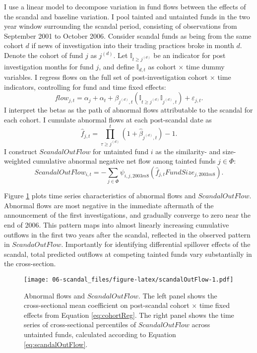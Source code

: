 \documentclass[openany]{book}
\theoremstyle{definition}
\theoremstyle{definition}
\theoremstyle{definition}
\theoremstyle{remark}
\begin{document}
I use a linear model to decompose variation in fund flows between the
effects of the scandal and baseline variation. I pool tainted and
untainted funds in the two year window surrounding the scandal period,
consisting of observations from September 2001 to October 2006. Consider
scandal funds as being from the same cohort \(d\) if news of
investigation into their trading practices broke in month \(d\). Denote
the cohort of fund \(j\) as \(j^{(d)}\). Let
\(\mathbb{I}_{t\geq j^{(d)}}\) be an indicator for post investigation
months for fund \(j\), and define \(\mathbb{I}_{d,t}\) as cohort
\(\times\) time dummy variables. I regress flows on the full set of
post-investigation cohort \(\times\) time indicators, controlling for
fund and time fixed effects: \begin{equation}
flow_{j,t}=\alpha_j+\alpha_t +\beta_{j^{(d)},t} \left( \mathbb{I}_{t\geq j^{(d)}}\mathbb{I}_{j^{(d)},t} \right) + \varepsilon_{j,t}.
\label{eq:cohortReg}
\end{equation} I interpret the betas as the path of abnormal flows
attributable to the scandal for each cohort. I cumulate abnormal flows
at each post-scandal date as \begin{equation}
\hat{f}_{j,t} = \prod_{\tau\geq j^{(d)}}^t \left(1+\hat{\beta}_{j^{(d)},t}\right) - 1.
\end{equation} I construct \(ScandalOutFlow\) for untainted fund \(i\)
as the similarity- and size-weighted cumulative abnormal negative net
flow among tainted funds \(j\in\Phi\): \begin{equation}
ScandalOutFlow_{i,t}= -\sum_{j\in \Phi} \psi_{i,j,2003m8} \left(\hat{f}_{j,t} FundSize_{j,2003m8} \right).
\label{eq:scandalOutFlow}
\end{equation}

Figure \ref{fig:scandalOutFlow} plots time series characteristics of
abnormal flows and \(ScandalOutFlow\). Abnormal flows are most negative
in the immediate aftermath of the announcement of the first
investigations, and gradually converge to zero near the end of 2006.
This pattern maps into almost linearly increasing cumulative outflows in
the first two years after the scandal, reflected in the observed pattern
in \(ScandaOutFlow\). Importantly for identifying differential spillover
effects of the scandal, total predicted outflows at competing tainted
funds vary substantially in the cross-section.

\begin{figure}
\centering
\texttt{[image: 06-scandal\_files/figure-latex/scandalOutFlow-1.pdf]}
\caption{\label{fig:scandalOutFlow}Abnormal flows and \(ScandalOutFlow\).
The left panel shows the cross-sectional mean coefficient on
post-scandal cohort \(\times\) time fixed effects from Equation
\eqref{eq:cohortReg}. The right panel shows the time series of
cross-sectional percentiles of \(ScandalOutFlow\) across untainted
funds, calculated according to Equation \eqref{eq:scandalOutFlow}.}
\end{figure}
\end{document}
